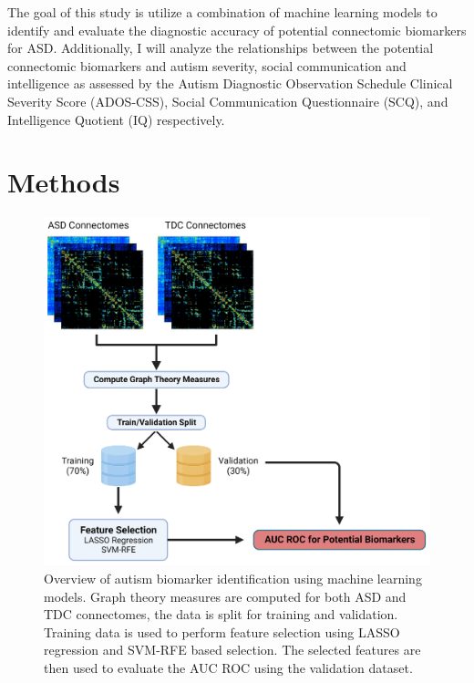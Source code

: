 \documentclass[11pt,conference]{IEEEtran}
\begin{document}
The goal of this study is utilize a combination of machine learning models to identify and 
evaluate the diagnostic accuracy of potential connectomic biomarkers for ASD. Additionally, 
I will analyze the relationships between the potential connectomic biomarkers and autism 
severity, social communication and intelligence as assessed by the Autism Diagnostic 
Observation Schedule Clinical Severity Score (ADOS-CSS), Social Communication 
Questionnaire (SCQ), and Intelligence Quotient (IQ) respectively.


\section{Methods}

\begin{figure}[ht]
    \vskip 0.2in
    \begin{center}
        \centerline{\includegraphics[width=\columnwidth]{../img/project_schematic_final.png}}
        \caption{
            Overview of autism biomarker identification using machine learning models.
            Graph theory measures are computed for both ASD and TDC connectomes, the 
            data is split for training and validation. Training data is used to perform 
            feature selection using LASSO regression and SVM-RFE based selection. The 
            selected features are then used to evaluate the AUC ROC using the validation 
            dataset.
        }
        \label{project-schematic}
    \end{center}
    \vskip -0.2in
\end{figure}
\end{document}
